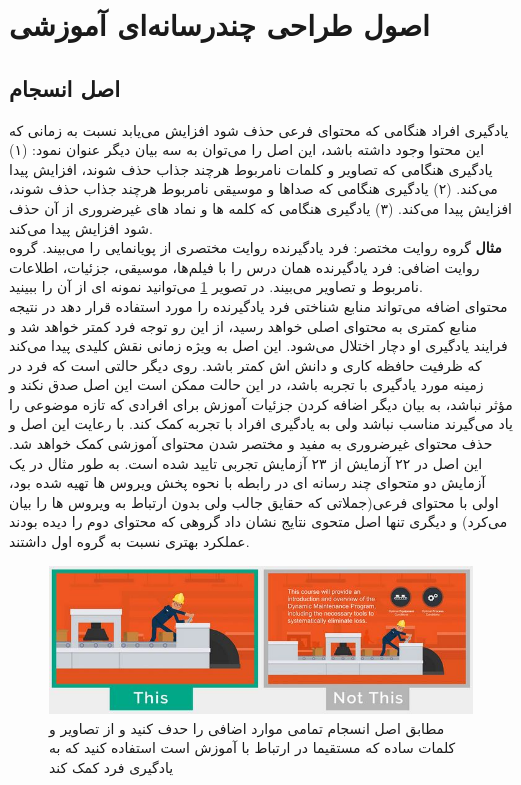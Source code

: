 \section{اصول طراحی چندرسانه‌ای آموزشی}
\label{s:multimedia}
\subsection{اصل انسجام}
یادگیری افراد هنگامی که محتوای فرعی حذف شود افزایش می‌یابد نسبت به زمانی که این محتوا وجود داشته باشد، این اصل را می‌توان به سه بیان دیگر عنوان نمود: ‍(۱) یادگیری هنگامی که تصاویر و کلمات نامربوط هرچند جذاب حذف شوند، افزایش پیدا می‌کند. (۲) یادگیری هنگامی که صداها و موسیقی نامربوط هرچند جذاب حذف شوند، افزایش پیدا می‌کند. (۳) یادگیری هنگامی که کلمه ها و نماد های غیرضروری از آن حذف شود افزایش پیدا می‌کند.
\\
\textbf{مثال}
گروه روایت مختصر: فرد یادگیرنده روایت مختصری از پویانمایی را می‌بیند.
گروه روایت اضافی: فرد یادگیرنده همان درس را با فیلم‌ها، موسیقی، جزئیات، اطلاعات نامربوط و تصاویر می‌بیند. در تصویر 
\ref{fig:coherenceexample}
می‌توانید نمونه ای از آن را ببینید.
\\
محتوای اضافه می‌تواند منابع شناختی فرد یادگیرنده را مورد استفاده قرار دهد در نتیجه منابع کمتری به محتوای اصلی خواهد رسید، از این رو توجه فرد کمتر خواهد شد و فرایند یادگیری او دچار اختلال می‌شود. این اصل به ویژه زمانی نقش کلیدی پیدا می‌کند که ظرفیت حافظه کاری و دانش اش کمتر باشد.
روی دیگر حالتی است که فرد در زمینه مورد یادگیری با تجربه باشد، در این حالت ممکن است این اصل صدق نکند و مؤثر نباشد، به بیان دیگر اضافه کردن جزئیات آموزش برای افرادی که تازه موضوعی را یاد می‌گیرند مناسب نباشد ولی به یادگیری افراد با تجربه کمک کند. با رعایت این اصل و حذف محتوای غیرضروری به مفید و مختصر شدن محتوای آموزشی کمک خواهد شد.
\cite{mayer2009multimedia}
این اصل در ۲۲ آزمایش از ۲۳ آزمایش تجربی تایید شده است. به طور مثال در یک آزمایش دو متحوای چند رسانه ای در رابطه با نحوه پخش ویروس ها تهیه شده بود، اولی با محتوای فرعی(جملاتی که حقایق جالب ولی بدون ارتباط به ویروس ها را بیان می‌کرد) و دیگری تنها اصل متحوی نتایج نشان داد گروهی که محتوای دوم را دیده بودند عملکرد بهتری نسبت به گروه اول داشتند.
\cite{mayer2008increased}

\begin{figure}[htbp]
	\centering
	\includegraphics[width=0.7\linewidth]{figures/Coherence_example}
	\caption[مثال اصل انسجام]{مطابق اصل انسجام تمامی موارد اضافی را حدف کنید و از تصاویر و کلمات ساده که مستقیما در ارتباط با آموزش است استفاده کنید که به یادگیری فرد کمک کند
	\cite{principle_examples}}
	\label{fig:coherenceexample}
\end{figure}


